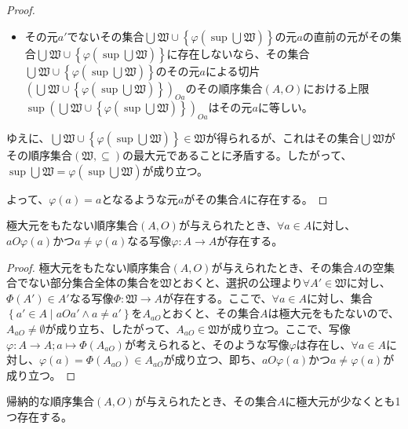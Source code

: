 \documentclass[dvipdfmx]{jsarticle}
\begin{document}
\begin{proof}
\begin{itemize}
\item
  その元$a'$でないその集合$\bigcup_{} \mathfrak{W} \cup \left\{ \varphi\left( \sup{\bigcup_{} \mathfrak{W}} \right) \right\}$の元$a$の直前の元がその集合$\bigcup_{} \mathfrak{W} \cup \left\{ \varphi\left( \sup{\bigcup_{} \mathfrak{W}} \right) \right\}$に存在しないなら、その集合$\bigcup_{} \mathfrak{W} \cup \left\{ \varphi\left( \sup{\bigcup_{} \mathfrak{W}} \right) \right\}$のその元$a$による切片$\left( \bigcup_{} \mathfrak{W} \cup \left\{ \varphi\left( \sup{\bigcup_{} \mathfrak{W}} \right) \right\} \right)_{Oa}$のその順序集合$(A,O)$における上限$\sup\left( \bigcup_{} \mathfrak{W} \cup \left\{ \varphi\left( \sup{\bigcup_{} \mathfrak{W}} \right) \right\} \right)_{Oa}$はその元$a$に等しい。
\end{itemize}
ゆえに、$\bigcup_{} \mathfrak{W} \cup \left\{ \varphi\left( \sup{\bigcup_{} \mathfrak{W}} \right) \right\}\in \mathfrak{W}$が得られるが、これはその集合$\bigcup_{} \mathfrak{W}$がその順序集合$\left( \mathfrak{W, \subseteq} \right)$の最大元であることに矛盾する。したがって、$\sup{\bigcup_{} \mathfrak{W}} = \varphi\left( \sup{\bigcup_{} \mathfrak{W}} \right)$が成り立つ。\par
よって、$\varphi(a) = a$となるような元$a$がその集合$A$に存在する。
\end{proof}
\begin{thm}\label{1.3.3.4}
極大元をもたない順序集合$(A,O)$が与えられたとき、$\forall a \in A$に対し、$aO\varphi(a)$かつ$a \neq \varphi(a)$なる写像$\varphi:A \rightarrow A$が存在する。
\end{thm}
\begin{proof}
極大元をもたない順序集合$(A,O)$が与えられたとき、その集合$A$の空集合でない部分集合全体の集合を$\mathfrak{W}$とおくと、選択の公理より$\forall A'\in \mathfrak{W}$に対し、$\Phi\left( A' \right) \in A'$なる写像$\Phi:\mathfrak{W \rightarrow}A$が存在する。ここで、$\forall a \in A$に対し、集合$\left\{ a' \in A \middle| aOa' \land a \neq a' \right\}$を$A_{aO}$とおくと、その集合$A$は極大元をもたないので、$A_{aO} \neq \emptyset$が成り立ち、したがって、$A_{aO}\in \mathfrak{W}$が成り立つ。ここで、写像$\varphi:A \rightarrow A;a \mapsto \Phi\left( A_{aO} \right)$が考えられると、そのような写像$\varphi$は存在し、$\forall a \in A$に対し、$\varphi(a) = \Phi\left( A_{aO} \right) \in A_{aO}$が成り立つ、即ち、$aO\varphi(a)$かつ$a \neq \varphi(a)$が成り立つ。
\end{proof}
\begin{thm}[Zornの補題]\label{1.3.3.5}
帰納的な順序集合$(A,O)$が与えられたとき、その集合$A$に極大元が少なくとも1つ存在する。
\end{thm}\par
\end{document}
